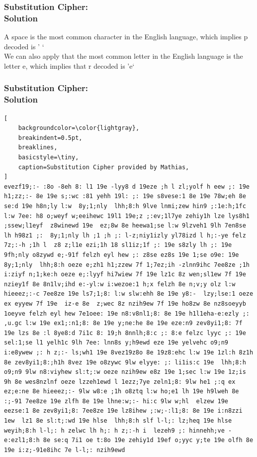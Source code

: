 \documentclass{uva-inf-presentation}
\begin{document}
\begin{frame}
\frametitle{Substitution Cipher:\\ Solution}
A space is the most common character in the English language,
which implies p decoded is ' `\\

We can also apply that the most common letter in the English language is the
letter e, which implies that r decoded is 'e`
\end{frame}

\begin{frame}[containsverbatim]
\frametitle{Substitution Cipher:\\ Solution}
\vspace{-20pt}
\begin{lstlisting}[
    backgroundcolor=\color{lightgray},
    breakindent=0.5pt,
    breaklines,
    basicstyle=\tiny,
    caption=Substitution Cipher provided by Mathias,
]
evezf19;:- :8o -8eh 8: l1 19e -lyy8 d 19eze ;h l zl;yolf h eew ;: 19e h1;zz;:- 8e 19e s;:wc :81 yehh 19l: ;: 19e s8vese:1 8e 19e 78w;eh 8e se:d 19e h8n;ly l:w  8y;1;nly  lhh;8:h 9lve lnmi;zew hin9 ;:1e:h;1fc l:w 7ee: h8 o;weyf w;eeihewc 19l1 19e;z ;:ev;1l7ye zehiy1h lze lys8h1 ;ssew;l1eyf  z8winewd 19e  ez;8w 8e heewa1;se l:w 9lzveh1 9lh 7en8se lh h98z1 ;:  8y;1;nly lh ;1 ;h ;: l-z;niy1izly yl78izd l h;:-ye felz 7z;:-h ;1h l  z8 z;l1e ezi;1h 18 sl1iz;1f ;: 19e s8zly lh ;: 19e  9fh;nly o8zywd e;-91f felzh eyl hew ;: z8se ez8s 19e 1;se o9e: 19e  8y;1;nly  lhh;8:h oeze e;zh1 h1;zzew 7f 1;7ez;ih -zlnn9ihc 7ee8ze ;1h i:ziyf n;1;ke:h oeze e;:lyyf hi7wiew 7f 19e lz1c 8z wen;sl1ew 7f 19e nziey1f 8e 8n1lv;ihd e:-yl:w i:wezoe:1 h;x felzh 8e n;v;y olz l:w hieeez;:-c 7ee8ze 19e ls7;1;8: l:w slw:ehh 8e 19e y8:-  lzy;lse:1 oeze ex eyyew 7f 19e  iz-e 8e  z;wec 8z nzih9ew 7f 19e ho8zw 8e nz8soeyyb 1oeyve felzh eyl hew 7e1oee: 19e n8:v8nl1;8: 8e 19e h1l1eha-e:ezly ;: ,u.gc l:w 19e ex1;:n1;8: 8e 19e y;ne:he 8e 19e eze:n9 zev8yi1;8: 7f 19e lzs 8e :l 8ye8:d 7i1c 8: 19;h 8nnlh;8:c ;: 8:e felzc lyyc ;: 19e sel:1;se l1 yelh1c 9lh 7ee: lnn8s y;h9ewd eze 19e yelvehc o9;n9 i:e8ywew ;: h z;:- ls;wh1 19e 8vez19z8o 8e 19z8:ehc l:w 19e 1zl:h 8z1h 8e zev8yi1;8:;h1h 8vez 19e o8zywc 9lw elyye: ;: li1is:c 19e  lhh;8:h o9;n9 9lw n8:viyhew sl:t;:w oeze nzih9ew e8z 19e 1;sec l:w 19e 1z;is 9h 8e wes8nzlnf oeze lzzeh1ewd l 1ezz;7ye zeln1;8: 9lw he1 ;:q ex ez;e:ne 8e hieeez;:- 9lw w8:e ;1h o8ztq l:w ho;e1 lh 19e h9lweh 8e :;-91 7ee8ze 19e zlfh 8e 19e lhne:w;:- hi:c 9lw w;hl  elzew 19e eezse:1 8e zev8yi1;8: 7ee8ze 19e lz8ihew ;:w;-:l1;8: 8e 19e i:n8zzi 1ew  lz1 8e sl:t;:wd 19e hlse  lhh;8:h slf l-l;: lz;heq 19e hlse weyih;8:h l-l;: h zelwc lh h;: h z;:-h i  lezeh9 ;: hinnehh;ve -e:ezl1;8:h 8e se:q 7i1 oe t:8o 19e zehiy1d 19ef o;yyc y;te 19e olfh 8e 19e i:z;-91e8ihc 7e l-l;: nzih9ewd
\end{lstlisting}
\end{frame}
\end{document}
